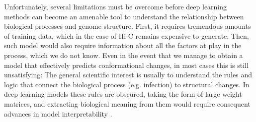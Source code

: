 Unfortunately, several limitations must be overcome before deep learning methods can become an amenable tool to understand the relationship between biological processes and genome structure. First, it requires tremendous amounts of training data, which in the case of Hi-C remains expensive to generate. Then, such model would also require information about all the factors at play in the process, which we do not know. Even in the event that we manage to obtain a model that effectively predicts conformational changes, in most cases this is still unsatisfying: The general scientific interest is usually to understand the rules and logic that connect the biological process (e.g. infection) to structural changes. In deep learning models these rules are obscured, taking the form of large weight matrices, and extracting biological meaning from them would require consequent advances in model interpretability \cite{talukderInterpretationDeepLearning2021}.
